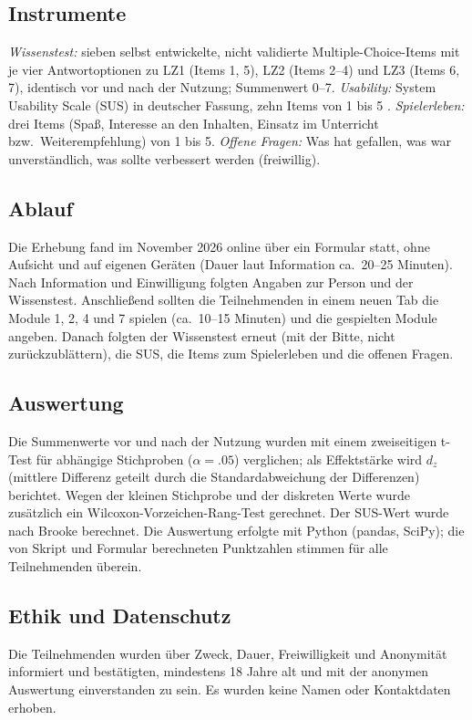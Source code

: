 \documentclass[sigconf,nonacm]{acmart}
\begin{document}
\subsection{Instrumente}
\textit{Wissenstest:} sieben selbst entwickelte, nicht validierte Multiple-Choice-Items mit je vier Antwortoptionen zu LZ1 (Items 1, 5), LZ2 (Items 2--4) und LZ3 (Items 6, 7), identisch vor und nach der Nutzung; Summenwert 0--7. \textit{Usability:} System Usability Scale (SUS) in deutscher Fassung, zehn Items von 1 bis 5 \cite{brooke1996}. \textit{Spielerleben:} drei Items (Spaß, Interesse an den Inhalten, Einsatz im Unterricht bzw.\ Weiterempfehlung) von 1 bis 5. \textit{Offene Fragen:} Was hat gefallen, was war unverständlich, was sollte verbessert werden (freiwillig).

\subsection{Ablauf}
Die Erhebung fand im November 2026 online über ein Formular statt, ohne Aufsicht und auf eigenen Geräten (Dauer laut Information ca.\ 20--25 Minuten). Nach Information und Einwilligung folgten Angaben zur Person und der Wissenstest. Anschließend sollten die Teilnehmenden in einem neuen Tab die Module 1, 2, 4 und 7 spielen (ca.\ 10--15 Minuten) und die gespielten Module angeben. Danach folgten der Wissenstest erneut (mit der Bitte, nicht zurückzublättern), die SUS, die Items zum Spielerleben und die offenen Fragen.

\subsection{Auswertung}
Die Summenwerte vor und nach der Nutzung wurden mit einem zweiseitigen t-Test für abhängige Stichproben ($\alpha = .05$) verglichen; als Effektstärke wird $d_z$ (mittlere Differenz geteilt durch die Standardabweichung der Differenzen) berichtet. Wegen der kleinen Stichprobe und der diskreten Werte wurde zusätzlich ein Wilcoxon-Vorzeichen-Rang-Test gerechnet. Der SUS-Wert wurde nach Brooke \cite{brooke1996} berechnet. Die Auswertung erfolgte mit Python (pandas, SciPy); die von Skript und Formular berechneten Punktzahlen stimmen für alle Teilnehmenden überein.

\subsection{Ethik und Datenschutz}
Die Teilnehmenden wurden über Zweck, Dauer, Freiwilligkeit und Anonymität informiert und bestätigten, mindestens 18 Jahre alt und mit der anonymen Auswertung einverstanden zu sein. Es wurden keine Namen oder Kontaktdaten erhoben.
\end{document}
